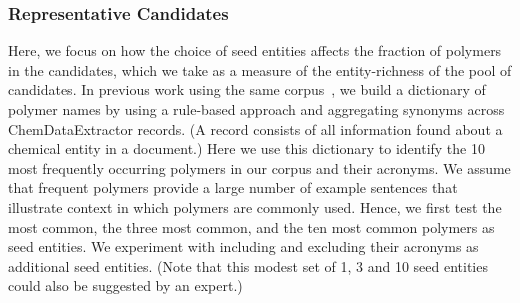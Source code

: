 \subsubsection{Representative Candidates}
Here, we focus on how the choice of seed entities affects the fraction of polymers in the candidates, which we take as a measure of the entity-richness of the pool of candidates.
In previous work using the same corpus~\cite{tchoua2016hybrid,tchoua2016hybridi}, we build a dictionary of polymer names by using a rule-based approach and aggregating synonyms across ChemDataExtractor records. (A record consists of all information found about a chemical entity in a document.)  
Here we use this dictionary to identify the 10 most frequently occurring polymers in our corpus and their acronyms.
We assume that frequent polymers provide a large number of example sentences that illustrate context in which polymers are commonly used.
Hence, we first test the most common, the three most common, and the ten most common polymers as seed entities.
We experiment with including and excluding their acronyms as additional seed entities.
(Note that this modest set of 1, 3 and 10 seed entities could also be suggested by an expert.)

